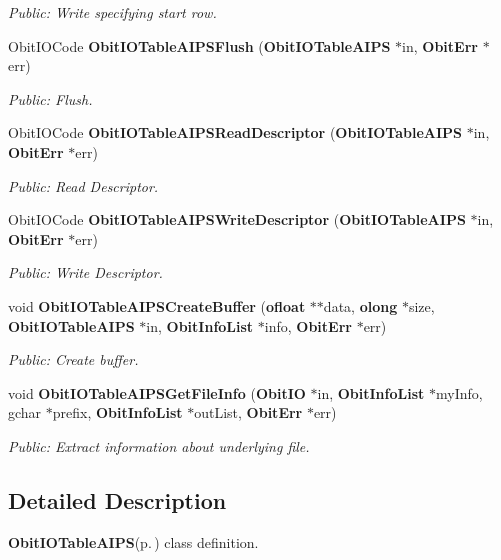 \begin{CompactItemize}
\begin{CompactList}\small\item\em Public: Write specifying start row. \item\end{CompactList}\item 
Obit\-IOCode {\bf Obit\-IOTable\-AIPSFlush} ({\bf Obit\-IOTable\-AIPS} $\ast$in, {\bf Obit\-Err} $\ast$err)
\begin{CompactList}\small\item\em Public: Flush. \item\end{CompactList}\item 
Obit\-IOCode {\bf Obit\-IOTable\-AIPSRead\-Descriptor} ({\bf Obit\-IOTable\-AIPS} $\ast$in, {\bf Obit\-Err} $\ast$err)
\begin{CompactList}\small\item\em Public: Read Descriptor. \item\end{CompactList}\item 
Obit\-IOCode {\bf Obit\-IOTable\-AIPSWrite\-Descriptor} ({\bf Obit\-IOTable\-AIPS} $\ast$in, {\bf Obit\-Err} $\ast$err)
\begin{CompactList}\small\item\em Public: Write Descriptor. \item\end{CompactList}\item 
void {\bf Obit\-IOTable\-AIPSCreate\-Buffer} ({\bf ofloat} $\ast$$\ast$data, {\bf olong} $\ast$size, {\bf Obit\-IOTable\-AIPS} $\ast$in, {\bf Obit\-Info\-List} $\ast$info, {\bf Obit\-Err} $\ast$err)
\begin{CompactList}\small\item\em Public: Create buffer. \item\end{CompactList}\item 
void {\bf Obit\-IOTable\-AIPSGet\-File\-Info} ({\bf Obit\-IO} $\ast$in, {\bf Obit\-Info\-List} $\ast$my\-Info, gchar $\ast$prefix, {\bf Obit\-Info\-List} $\ast$out\-List, {\bf Obit\-Err} $\ast$err)
\begin{CompactList}\small\item\em Public: Extract information about underlying file. \item\end{CompactList}\end{CompactItemize}


\subsection{Detailed Description}
{\bf Obit\-IOTable\-AIPS}{\rm (p.\,\pageref{structObitIOTableAIPS})} class definition. 

